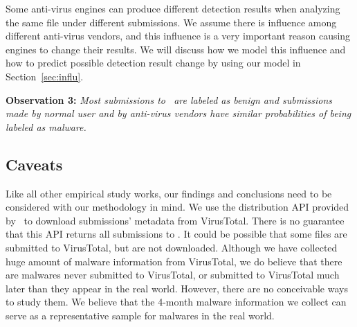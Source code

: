 Some anti-virus engines can produce different detection results when analyzing the same file under different submissions.
We assume there is influence among different anti-virus vendors, 
and this influence is a very important reason causing engines to change their results.
We will discuss how we model this influence and how to predict possible detection result change by using our model in Section~\ref{sec:influ}.
\fi

{\bf Observation 3:} 
{\em Most submissions to \vt\ are labeled as benign and 
submissions made by normal user and by anti-virus vendors have similar probabilities of being labeled as malware.}

\subsection{Caveats}
Like all other empirical study works, 
our findings and conclusions need to be considered with our methodology in mind. 
We use the distribution API provided by \vt\ to download submissions' metadata 
from VirusTotal. 
There is no guarantee that this API returns all submissions to \vt.
It could be possible that some files are submitted to VirusTotal, 
but are not downloaded. %
Although we have collected huge amount of malware information from VirusTotal,
we do believe that there are malwares never submitted to VirusTotal, 
or submitted to VirusTotal much later than they appear in the real world. 
However, there are no conceivable ways to study them.
We believe that the 4-month malware information we collect can serve as a representative sample for malwares in the real world. 

